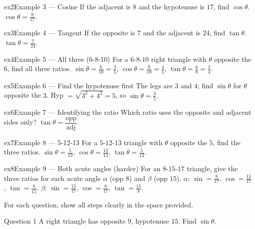 \documentclass[11pt]{article}
\begin{document}
\begin{example}{ex2}{Example 3 --- Cosine}
If the adjacent is $8$ and the hypotenuse is $17$, find $\cos\theta$.
\soln $\cos\theta=\tfrac{8}{17}.$
\end{example}

\begin{example}{ex3}{Example 4 --- Tangent}
If the opposite is $7$ and the adjacent is $24$, find $\tan\theta$.
\soln $\tan\theta=\tfrac{7}{24}.$
\end{example}

\begin{example}{ex4}{Example 5 --- All three (6-8-10)}
For a $6$-$8$-$10$ right triangle with $\theta$ opposite the $6$, find all three ratios.
\soln $\sin\theta=\tfrac{6}{10}=\tfrac35$, $\cos\theta=\tfrac{8}{10}=\tfrac45$, $\tan\theta=\tfrac68=\tfrac34.$
\end{example}

\begin{example}{ex5}{Example 6 --- Find the hypotenuse first}
The legs are $3$ and $4$; find $\sin\theta$ for $\theta$ opposite the $3$.
\soln Hyp $=\sqrt{3^2+4^2}=5$, so $\sin\theta=\tfrac35.$
\end{example}

\begin{example}{ex6}{Example 7 --- Identifying the ratio}
Which ratio uses the opposite and adjacent sides only?
\soln $\tan\theta=\dfrac{\text{opp}}{\text{adj}}.$
\end{example}

\begin{example}{ex7}{Example 8 --- 5-12-13}
For a $5$-$12$-$13$ triangle with $\theta$ opposite the $5$, find the three ratios.
\soln $\sin\theta=\tfrac{5}{13}$, $\cos\theta=\tfrac{12}{13}$, $\tan\theta=\tfrac{5}{12}.$
\end{example}

\begin{example}{ex8}{Example 9 --- Both acute angles (harder)}
For an $8$-$15$-$17$ triangle, give the three ratios for each acute angle $\alpha$ (opp $8$) and $\beta$ (opp $15$).
\soln $\alpha$: $\sin=\tfrac{8}{17}$, $\cos=\tfrac{15}{17}$, $\tan=\tfrac{8}{15}$. $\beta$: $\sin=\tfrac{15}{17}$, $\cos=\tfrac{8}{17}$, $\tan=\tfrac{15}{8}.$
\end{example}

\clearpage
{}
For each question, show all steps clearly in the space provided.

\begin{qbox}{Question 1}
A right triangle has opposite $9$, hypotenuse $15$. Find $\sin\theta$.\workspace{1.8cm}
\end{qbox}
\end{document}
